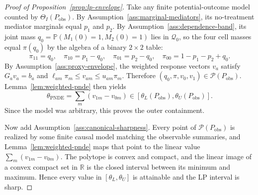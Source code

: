 \documentclass[11pt]{article}
\renewcommand{\Pr}{\mathbb{P}}
\newcommand{\R}{\mathbb{R}}
\theoremstyle{definition}
\theoremstyle{plain}
\theoremstyle{remark}
\begin{document}
\begin{proof}[Proof of Proposition~\ref{prop:lp-envelope}]
Take any finite potential-outcome model counted by
\(\Theta_I(P_{\mathrm{obs}})\).  By Assumption~\ref{ass:marginal-mediators},
its no-treatment mediator marginals equal \(p_1\) and \(p_2\).  By
Assumption~\ref{ass:dependence-band}, its joint mass
\(q_0=\Pr(M_1(0)=1,M_2(0)=1)\) lies in \(\mathcal Q_0\), so the four cell
masses equal \(\pi(q_0)\) by the algebra of a binary \(2\times2\) table:
\[
  \pi_{11}=q_0,\quad
  \pi_{10}=p_1-q_0,\quad
  \pi_{01}=p_2-q_0,\quad
  \pi_{00}=1-p_1-p_2+q_0.
\]
By Assumption~\ref{ass:proxy-envelope}, the weighted response vectors
\(v_a\) satisfy \(G_a v_a=b_a\) and
\(\ell_{am}\pi_m\le v_{am}\le u_{am}\pi_m\).  Therefore
\((q_0,\pi,v_0,v_1)\in\mathcal P(P_{\mathrm{obs}})\).
Lemma~\ref{lem:weighted-pnde} then yields
\[
  \theta_{\mathrm{PNDE}}
  =\sum_m(v_{1m}-v_{0m})
  \in
  [\theta_L(P_{\mathrm{obs}}),\theta_U(P_{\mathrm{obs}})].
\]
Since the model was arbitrary, this proves the outer containment.

Now add Assumption~\ref{ass:canonical-sharpness}.  Every point of
\(\mathcal P(P_{\mathrm{obs}})\) is realized by some finite causal model
matching the observable summaries, and Lemma~\ref{lem:weighted-pnde} maps that
point to the linear value \(\sum_m(v_{1m}-v_{0m})\).  The polytope is convex
and compact, and the linear image of a convex compact set in \(\R\) is the
closed interval between its minimum and maximum.  Hence every value in
\([\theta_L,\theta_U]\) is attainable and the LP interval is sharp.
\end{proof}
\end{document}
